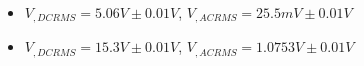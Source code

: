 \begin{itemize}
     \item $V_{, DCRMS}=5.06V\pm 0.01\unit{V}$, $V_{, ACRMS}=25.5mV\pm 0.01\unit{V}$ 
     \item $V_{, DCRMS}=15.3V\pm 0.01\unit{V}$, $V_{, ACRMS}=1.0753V\pm 0.01\unit{V}$\\
\end{itemize}
